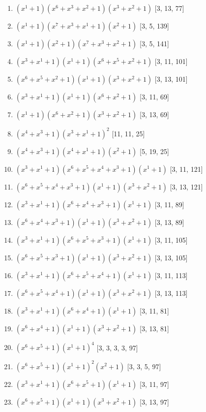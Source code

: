 \documentclass[10pt,twocolumn]{article}
\begin{document}
\begin{enumerate}
\item $(x^{1} + 1)(x^{6} + x^{3} + x^{2} + 1)(x^{3} + x^{2} + 1)$  [3, 13, 77]
\item $(x^{1} + 1)(x^{7} + x^{3} + x^{1} + 1)(x^{2} + 1)$  [3, 5, 139]
\item $(x^{1} + 1)(x^{2} + 1)(x^{7} + x^{3} + x^{2} + 1)$  [3, 5, 141]
\item $(x^{3} + x^{1} + 1)(x^{1} + 1)(x^{6} + x^{5} + x^{2} + 1)$  [3, 11, 101]
\item $(x^{6} + x^{5} + x^{2} + 1)(x^{1} + 1)(x^{3} + x^{2} + 1)$  [3, 13, 101]
\item $(x^{3} + x^{1} + 1)(x^{1} + 1)(x^{6} + x^{2} + 1)$  [3, 11, 69]
\item $(x^{1} + 1)(x^{6} + x^{2} + 1)(x^{3} + x^{2} + 1)$  [3, 13, 69]
\item $(x^{4} + x^{3} + 1)(x^{3} + x^{1} + 1)^{2}$  [11, 11, 25]
\item $(x^{4} + x^{3} + 1)(x^{4} + x^{1} + 1)(x^{2} + 1)$  [5, 19, 25]
\item $(x^{3} + x^{1} + 1)(x^{6} + x^{5} + x^{4} + x^{3} + 1)(x^{1} + 1)$  [3, 11, 121]
\item $(x^{6} + x^{5} + x^{4} + x^{3} + 1)(x^{1} + 1)(x^{3} + x^{2} + 1)$  [3, 13, 121]
\item $(x^{3} + x^{1} + 1)(x^{6} + x^{4} + x^{3} + 1)(x^{1} + 1)$  [3, 11, 89]
\item $(x^{6} + x^{4} + x^{3} + 1)(x^{1} + 1)(x^{3} + x^{2} + 1)$  [3, 13, 89]
\item $(x^{3} + x^{1} + 1)(x^{6} + x^{5} + x^{3} + 1)(x^{1} + 1)$  [3, 11, 105]
\item $(x^{6} + x^{5} + x^{3} + 1)(x^{1} + 1)(x^{3} + x^{2} + 1)$  [3, 13, 105]
\item $(x^{3} + x^{1} + 1)(x^{6} + x^{5} + x^{4} + 1)(x^{1} + 1)$  [3, 11, 113]
\item $(x^{6} + x^{5} + x^{4} + 1)(x^{1} + 1)(x^{3} + x^{2} + 1)$  [3, 13, 113]
\item $(x^{3} + x^{1} + 1)(x^{6} + x^{4} + 1)(x^{1} + 1)$  [3, 11, 81]
\item $(x^{6} + x^{4} + 1)(x^{1} + 1)(x^{3} + x^{2} + 1)$  [3, 13, 81]
\item $(x^{6} + x^{5} + 1)(x^{1} + 1)^{4}$  [3, 3, 3, 3, 97]
\item $(x^{6} + x^{5} + 1)(x^{1} + 1)^{2}(x^{2} + 1)$  [3, 3, 5, 97]
\item $(x^{3} + x^{1} + 1)(x^{6} + x^{5} + 1)(x^{1} + 1)$  [3, 11, 97]
\item $(x^{6} + x^{5} + 1)(x^{1} + 1)(x^{3} + x^{2} + 1)$  [3, 13, 97]

\end{enumerate}
\end{document}
